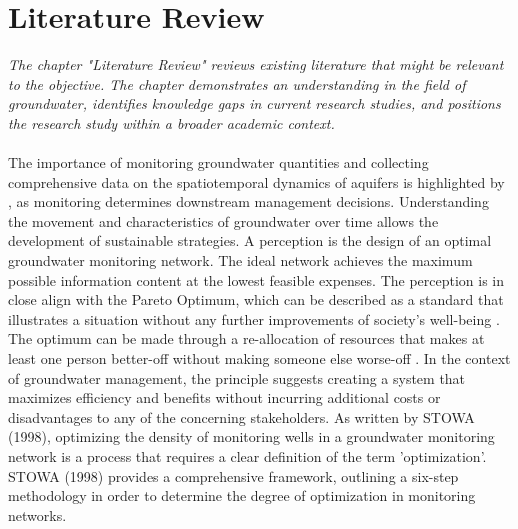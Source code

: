 \chapter{Literature Review}
\textit{The chapter "Literature Review" reviews existing literature that might be relevant to the objective. The chapter demonstrates an understanding in the field of groundwater, identifies knowledge gaps in current research studies, and positions the research study within a broader academic context.}\\
\\
The importance of monitoring groundwater quantities and collecting comprehensive data on the spatiotemporal dynamics of aquifers is highlighted by \cite{ohmer-2019}, as monitoring determines downstream management decisions. Understanding the movement and characteristics of groundwater over time allows the development of sustainable strategies. A perception is the design of an optimal groundwater monitoring network. The ideal network achieves the maximum possible information content at the lowest feasible expenses. The perception is in close align with the Pareto Optimum, which can be described as a standard that illustrates a situation without any further improvements of society's well-being \cite{smith-2013}. The optimum can be made through a re-allocation of resources that makes at least one person better-off without making someone else worse-off \cite{smith-2013}. In the context of groundwater management, the principle suggests creating a system that maximizes efficiency and benefits without incurring additional costs or disadvantages to any of the concerning stakeholders. As written by STOWA (1998), optimizing the density of monitoring wells in a groundwater monitoring network is a process that requires a clear definition of the term 'optimization'. STOWA (1998) provides a comprehensive framework, outlining a six-step methodology in order to determine the degree of optimization in monitoring networks. 

